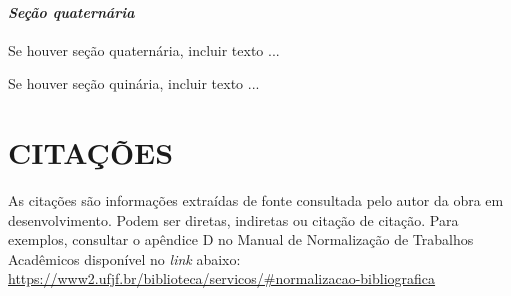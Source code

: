\documentclass[
  oneside, %
  english,
  brazil
]{abntbibufjf}
\begin{document}









\subsubsection{\textit{Seção quaternária}}

Se houver seção quaternária, incluir texto ...



Se houver seção quinária, incluir texto ...



\chapter{CITAÇÕES}

As citações são informações extraídas de fonte consultada pelo autor da obra em desenvolvimento.
Podem ser diretas, indiretas ou citação de citação.
Para exemplos, consultar o apêndice D no Manual de Normalização de Trabalhos Acadêmicos disponível no \textit{link} abaixo:\\
\url{https://www2.ufjf.br/biblioteca/servicos/#normalizacao-bibliografica}
\end{document}
